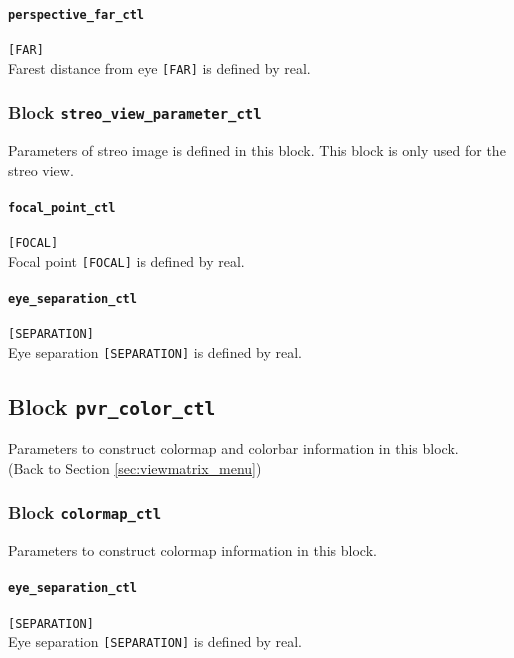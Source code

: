 \paragraph{\tt perspective\_far\_ctl}
\label{href_t:perspective_far_ctl}
\verb|[FAR]| \\
Farest distance from eye \verb|[FAR]| is defined by real.


\subsubsection{Block {\tt streo\_view\_parameter\_ctl}}
\label{href_t:streo_view_parameter_ctl}
Parameters of streo image is defined in this block. This block is only used for the streo view.

\paragraph{\tt focal\_point\_ctl}
\label{href_t:focal_point_ctl}
\verb|[FOCAL]| \\
Focal point \verb|[FOCAL]| is defined by real.

\paragraph{\tt eye\_separation\_ctl}
\label{href_t:eye_separation_ctl}
\verb|[SEPARATION]| \\
Eye separation \verb|[SEPARATION]| is defined by real.



\subsection{Block {\tt pvr\_color\_ctl}}
\label{href_t:pvr_color_ctl}
Parameters to construct colormap and colorbar information in this block. \\
(Back to Section \ref{sec:viewmatrix_menu}) \\

\subsubsection{Block {\tt colormap\_ctl}}
\label{href_t:colormap_ctl}
Parameters to construct colormap information in this block. \\

\paragraph{\tt eye\_separation\_ctl}
\label{href_t:eye_separation_ctl}
\verb|[SEPARATION]| \\
Eye separation \verb|[SEPARATION]| is defined by real.

